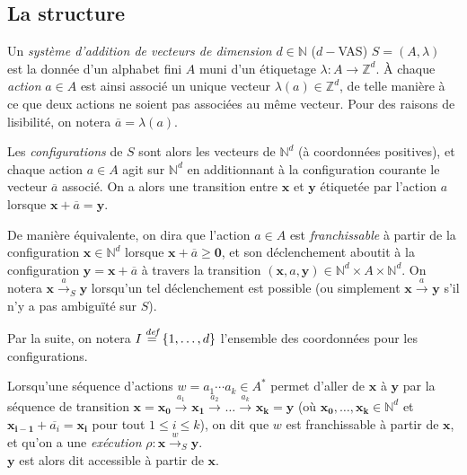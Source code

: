 \documentclass[a4paper,final]{article}
\theoremstyle{definition}
\let\leq\leqslant
\let\geq\geqslant
\newcommand{\os}[1]{\left\{\mathinner{#1}\right\}}
\newcommand{\defeq}{\ensuremath{\stackrel{\textit{def}}{=}}}
\newcommand{\N}{\ensuremath{\mathbb{N}}}
\newcommand{\Z}{\ensuremath{\mathbb{Z}}}
\newcommand{\trans}[2]{\ensuremath{\stackrel{#1}{\longrightarrow}_{#2}}}
\newcommand{\vect}[1]{\ensuremath{\mathbf{#1}}}
\newcommand{\valeur}[1]{\ensuremath{\overline{#1}}}
\begin{document}
\subsection{La structure}

Un \emph{système d'addition de vecteurs de dimension} $d\in\N$ ($d-$VAS) $S=(A,\lambda)$ est la donnée 
d'un alphabet fini $A$ muni d'un étiquetage $\lambda:A\to\Z^d$.
À chaque \emph{action} $a\in A$ est ainsi associé un unique vecteur $\lambda(a)\in \Z^d$, de telle manière à ce que deux actions ne soient pas associées au même vecteur.
Pour des raisons de lisibilité, on notera $\valeur{a}=\lambda(a)$.
\vspace{3mm}

Les \emph{configurations} de $S$ sont alors les vecteurs de $\N^d$ (à coordonnées positives), 
et chaque action $a\in A$ agit sur $\N^d$ en additionnant à la configuration courante le vecteur $\valeur{a}$ associé.
On a alors une transition entre $\vect{x}$ et $\vect{y}$ étiquetée par l'action $a$ lorsque $\vect{x} + \valeur{a} = \vect{y}$.

De manière équivalente, on dira que l'action $a\in A$ est \emph{franchissable} 
à partir de la configuration $\vect{x}\in \N^d$ lorsque $\vect{x} + \valeur{a} \geq \vect{0}$,
et son déclenchement aboutit à la configuration $\vect{y} = \vect{x} + \valeur{a}$ à travers la transition $(\vect{x},a,\vect{y})\in \N^d\times A\times \N^d$.
On notera $\vect{x}\trans{a}{S} \vect{y}$ lorsqu'un tel déclenchement est possible (ou simplement $\vect{x}\trans{a}{} \vect{y}$ s'il n'y a pas ambiguïté sur $S$).

\begin{center}
Par la suite, on notera $I \defeq \os{1,\dots,d}$ l'ensemble des coordonnées pour les configurations.
\end{center}


Lorsqu'une séquence d'actions $w= a_1\cdots a_k\in A^\ast$ permet d'aller de $\vect{x}$ à $\vect{y}$ par la séquence de transition $\vect{x}= \vect{x_0}\trans{a_1}{} \vect{x_1}\trans{a_2}{} \dots\trans{a_k}{} \vect{x_k}=\vect{y}$
(où $\vect{x_0},\dots,\vect{x_k} \in\N^d$ et $\vect{x_{i-1}} +\valeur{a_i} =\vect{x_i}$ pour tout $1\leq i\leq k$),
on dit que $w$ est franchissable à partir de $\vect{x}$, et qu'on a une \emph{exécution} $\rho :\vect{x}\trans{w}{S} \vect{y}$.\\
$\vect{y}$ est alors dit accessible à partir de $\vect{x}$.
\end{document}
